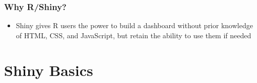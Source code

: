 \documentclass[
	11pt, %
]{beamer}
\begin{document}
\begin{frame}
	\frametitle{Why R/Shiny?}
	
	\begin{itemize}
		\item Shiny gives R users the power to build a dashboard without prior knowledge of HTML, CSS, and JavaScript, but retain the ability to use them if needed
	\end{itemize}
	
	
\end{frame}


\section{Shiny Basics}
\end{document}
